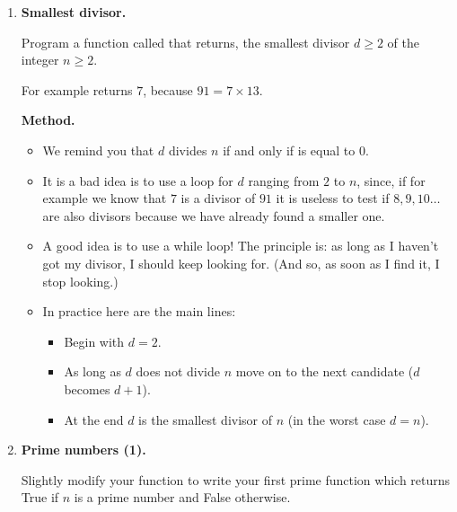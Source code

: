 \documentclass[11pt,class=report,crop=false]{standalone}
\begin{document}
\begin{activite}



\begin{enumerate}
  \item \textbf{Smallest divisor.}
  
  Program a function called  that returns, the smallest divisor $d\ge2$ of the integer $n\ge2$.
  
  For example  returns $7$, because $91 = 7 \times 13$.
  
  \medskip
  
  \textbf{Method.}
  \begin{itemize}
    \item We remind you that $d$ divides $n$ if and only if  is equal to $0$.
    \item It is a bad idea is to use a loop \og{}for $d$ ranging from $2$ to $n$\fg{}, since, if for example we know that $7$ is a divisor of $91$ it is useless to test if $8,9,10\ldots$ are also divisors because we have already found a smaller one.
    
    \item A good idea is to use a \og{}while\fg{} loop!
    The principle is: \og{}as long as I haven't got my divisor, I should keep looking for\fg{}. (And so, as soon as I find it, I stop looking.)
    
    \item In practice here are the main lines:
    \begin{itemize}
      \item Begin with $d=2$.
      \item As long as $d$ does not divide $n$ move on to the next candidate ($d$ becomes $d+1$).
      \item At the end $d$ is the smallest divisor of $n$ (in the worst case $d=n$).
     \end{itemize} 
  \end{itemize}
  
  
  \item \textbf{Prime numbers (1).}
  
  Slightly modify your function  to write your first  prime function  which returns \og{}True\fg{} if $n$ is a prime number and \og{}False\fg{} otherwise.
  

\end{enumerate}
\end{activite}
\end{document}
